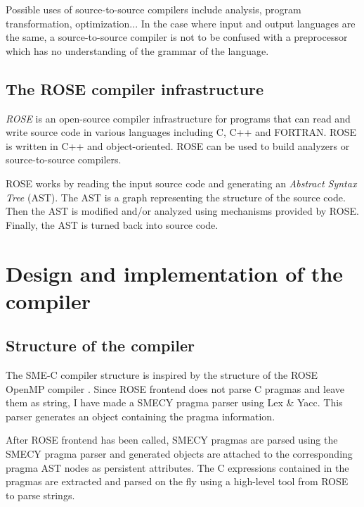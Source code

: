\documentclass [A4]{article}
\begin{document}
	Possible uses of source-to-source compilers include analysis, program transformation, optimization... In the case where input and output languages are the same, a source-to-source compiler is not to be confused with a preprocessor which has no understanding of the grammar of the language.
	

	\subsection{The ROSE compiler infrastructure}
	\emph{ROSE} is an open-source compiler infrastructure for programs that can read and write source code in various languages including C, C++ and FORTRAN. ROSE is written in C++ and object-oriented. ROSE can be used to build analyzers or source-to-source compilers.
	
	ROSE works by reading the input source code and generating an \emph{Abstract Syntax Tree} (AST). The AST is a graph representing the structure of the source code. Then the AST is modified and/or analyzed using mechanisms provided by ROSE. Finally, the AST is turned back into source code. 
	
	
\section{Design and implementation of the compiler}

	\subsection{Structure of the compiler}
	The SME-C compiler structure is inspired by the structure of the ROSE OpenMP compiler \cite{roseomp}. Since ROSE frontend does not parse C pragmas and leave them as string, I have made a SMECY pragma parser using Lex \& Yacc. This parser generates an object containing the pragma information.
	
	After ROSE frontend has been called, SMECY pragmas are parsed using the SMECY pragma parser and generated objects are attached to the corresponding pragma AST nodes as persistent attributes. The C expressions contained in the pragmas are extracted and parsed on the fly using a high-level tool from ROSE to parse strings.
	
\end{document}
